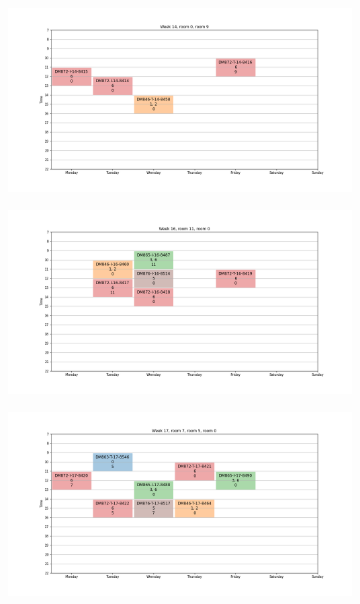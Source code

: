 \documentclass{article}
\begin{document}
    \subsection{}
    \begin{figure}
        \vspace{-3.2cm}
        \hspace*{-5cm}
        \begin{subfigure}{.85\textwidth}
            \centering
            \includegraphics[width=1.1\linewidth]{../images/week-14.png}
        \end{subfigure}%
        \begin{subfigure}{.85\textwidth}
            \centering
            \includegraphics[width=1.1\linewidth]{../images/week-16.png}
        \end{subfigure}
        \hspace*{-5cm}
        \begin{subfigure}{.85\textwidth}
            \centering
            \includegraphics[width=1.1\linewidth]{../images/week-17.png}

\end{subfigure}
\end{figure}
\end{document}
